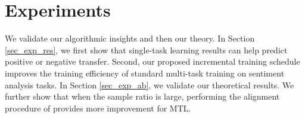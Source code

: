 \section{Experiments}

\vspace{-0.05in}
We validate our  algorithmic insights and then our theory.
In Section \ref{sec_exp_res}, we first show that single-task learning results can help predict positive or negative transfer.
Second, our proposed incremental training schedule improves the training efficiency of standard multi-task training on sentiment analysis tasks.
In Section \ref{sec_exp_ab}, we validate our theoretical results.
We further show that when the sample ratio is large, performing the alignment procedure of \cite{WZR20} provides more improvement for MTL.

